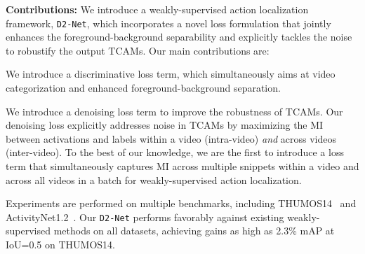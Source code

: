 \documentclass[10pt,twocolumn,letterpaper]{article}
\def\proposed{\texttt{D2-Net}{}}
\begin{document}
\noindent\textbf{Contributions:} We introduce a weakly-supervised action localization framework, \proposed{}, which incorporates a novel loss formulation that jointly enhances the foreground-background separability and explicitly tackles the noise to robustify the output TCAMs. 
Our main contributions are: 
\begin{compactitem}
\item We introduce a discriminative loss term, which simultaneously aims at video categorization and enhanced foreground-background separation.
\item We introduce a denoising loss term to improve the robustness of TCAMs. Our denoising loss explicitly addresses noise in TCAMs by maximizing the MI between activations and labels within a video (intra-video) \textit{and} across videos (inter-video).  To the best of our knowledge, we are the first to introduce a loss term that simultaneously captures MI across multiple snippets within a video and across all videos in a batch for weakly-supervised action localization.

\item Experiments are performed on multiple benchmarks, including THUMOS14~\cite{thumos14} and ActivityNet1.2~\cite{activitynet}. Our \proposed{} performs favorably against existing weakly-supervised methods on all datasets, achieving gains as high as 2.3\% mAP at IoU=0.5 on THUMOS14. 

\end{compactitem}
\end{document}
